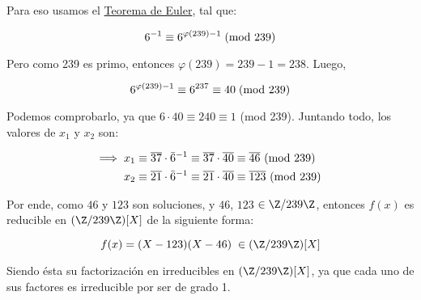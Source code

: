 \documentclass[../main.tex]{subfiles}
\begin{document}
{\begin{enumerate}
{        \newpage Para eso usamos el \hyperref[inverso_mod_n]{Teorema de Euler}, tal que:
        
        \begin{equation*}
            6 ^ {-1} \equiv 6 ^ {\varphi (239) - 1} \hspace{1mm} \text{(mod 239)}
        \end{equation*}
        
        Pero como 239 es primo, entonces $\varphi (239) = 239 - 1 = 238$. Luego,
        
        \begin{equation*}
            6 ^ {\varphi (239) - 1} \equiv 6 ^ {237} \equiv 40 \hspace{1mm} \text{(mod 239)}
        \end{equation*}
        
        Podemos comprobarlo, ya que $6 \cdot 40 \equiv 240 \equiv 1 $ (mod 239). Juntando todo, los valores de $x_1$ y $x_2$ son:
        
        \begin{align*}
            \Longrightarrow \hspace{2mm} & x_1 \equiv \overline{37} \cdot {\bar{6}}^{-1} \equiv \overline{37} \cdot \overline{40} \equiv \overline{46} \text{ (mod 239)}\\
            & x_2 \equiv \overline{21} \cdot {\bar{6}}^{-1}  \equiv \overline{21} \cdot \overline{40} \equiv \overline{123} \text{ (mod 239)}\\
        \end{align*}
        
        Por ende, como $46$ y $123$ son soluciones, y $46$, $123$ $\in \Z/239\Z$, entonces $f(x)$ es reducible en $(\Z/239\Z)[X]$ de la siguiente forma:
        
        \begin{equation*}
            f(x) = (X-123)(X-46) \hspace{1mm} \in (\Z/239\Z)[X]
        \end{equation*}
        
        Siendo ésta su factorización en irreducibles en $(\Z/239\Z)[X]$, ya que cada uno de sus factores es irreducible por ser de grado 1.
        
    }
\end{enumerate}

}
\end{document}
